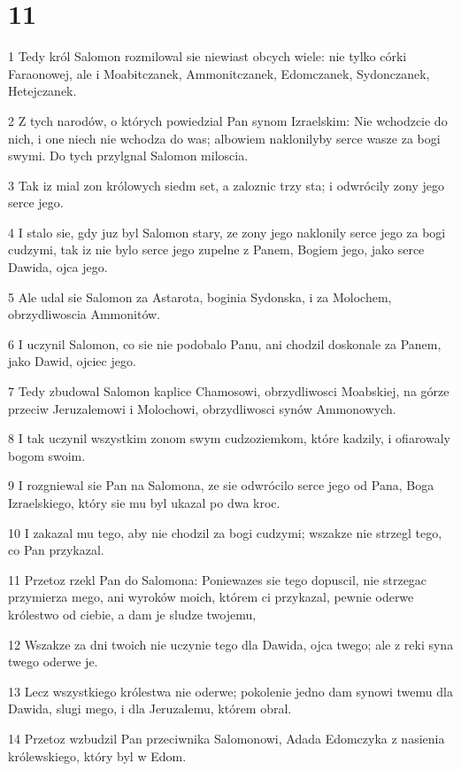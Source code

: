 \chapter{11}

\par 1 Tedy król Salomon rozmilowal sie niewiast obcych wiele: nie tylko córki Faraonowej, ale i Moabitczanek, Ammonitczanek, Edomczanek, Sydonczanek, Hetejczanek.
\par 2 Z tych narodów, o których powiedzial Pan synom Izraelskim: Nie wchodzcie do nich, i one niech nie wchodza do was; albowiem naklonilyby serce wasze za bogi swymi. Do tych przylgnal Salomon miloscia.
\par 3 Tak iz mial zon królowych siedm set, a zaloznic trzy sta; i odwrócily zony jego serce jego.
\par 4 I stalo sie, gdy juz byl Salomon stary, ze zony jego naklonily serce jego za bogi cudzymi, tak iz nie bylo serce jego zupelne z Panem, Bogiem jego, jako serce Dawida, ojca jego.
\par 5 Ale udal sie Salomon za Astarota, boginia Sydonska, i za Molochem, obrzydliwoscia Ammonitów.
\par 6 I uczynil Salomon, co sie nie podobalo Panu, ani chodzil doskonale za Panem, jako Dawid, ojciec jego.
\par 7 Tedy zbudowal Salomon kaplice Chamosowi, obrzydliwosci Moabskiej, na górze przeciw Jeruzalemowi i Molochowi, obrzydliwosci synów Ammonowych.
\par 8 I tak uczynil wszystkim zonom swym cudzoziemkom, które kadzily, i ofiarowaly bogom swoim.
\par 9 I rozgniewal sie Pan na Salomona, ze sie odwrócilo serce jego od Pana, Boga Izraelskiego, który sie mu byl ukazal po dwa kroc.
\par 10 I zakazal mu tego, aby nie chodzil za bogi cudzymi; wszakze nie strzegl tego, co Pan przykazal.
\par 11 Przetoz rzekl Pan do Salomona: Poniewazes sie tego dopuscil, nie strzegac przymierza mego, ani wyroków moich, którem ci przykazal, pewnie oderwe królestwo od ciebie, a dam je sludze twojemu,
\par 12 Wszakze za dni twoich nie uczynie tego dla Dawida, ojca twego; ale z reki syna twego oderwe je.
\par 13 Lecz wszystkiego królestwa nie oderwe; pokolenie jedno dam synowi twemu dla Dawida, slugi mego, i dla Jeruzalemu, którem obral.
\par 14 Przetoz wzbudzil Pan przeciwnika Salomonowi, Adada Edomczyka z nasienia królewskiego, który byl w Edom.
